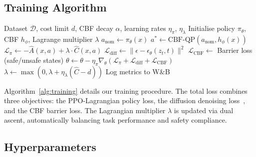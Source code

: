 \documentclass[10pt,twocolumn]{article}
\begin{document}
\subsection{Training Algorithm}

\begin{algorithm}[t]
\caption{FLEET-Safe VLA Training (PPO-Lagrangian + CBF)}
\label{alg:training}
\begin{algorithmic}[1]
\REQUIRE Dataset $\mathcal{D}$, cost limit $d$, CBF decay $\alpha$, learning rates $\eta_\pi$, $\eta_\lambda$
\STATE Initialise policy $\pi_\theta$, CBF $h_\phi$, Lagrange multiplier $\lambda$
        \STATE $a_\text{nom} \leftarrow \pi_\theta(x)$ 
        \STATE $a^* \leftarrow \text{CBF-QP}(a_\text{nom}, h_\phi(x))$ 
        \STATE $\mathcal{L}_\pi \leftarrow -\hat{A}(x,a) + \lambda \cdot \hat{C}(x,a)$ 
        \STATE $\mathcal{L}_\text{diff} \leftarrow \| \epsilon - \epsilon_\theta(z_t, t) \|^2$ 
        \STATE $\mathcal{L}_\text{CBF} \leftarrow$ Barrier loss (safe/unsafe states)
        \STATE $\theta \leftarrow \theta - \eta_\pi \nabla_\theta (\mathcal{L}_\pi + \mathcal{L}_\text{diff} + \mathcal{L}_\text{CBF})$
        \STATE $\lambda \leftarrow \max(0, \lambda + \eta_\lambda (\hat{C} - d))$ 
    \ENDFOR
    \STATE Log metrics to W\&B~\cite{wandb2020}
\ENDFOR
\end{algorithmic}
\end{algorithm}

Algorithm~\ref{alg:training} details our training procedure.
The total loss combines three objectives: the PPO-Lagrangian policy loss, the diffusion denoising loss~\cite{ho2020ddpm, chi2023diffusion}, and the CBF barrier loss.
The Lagrangian multiplier $\lambda$ is updated via dual ascent, automatically balancing task performance and safety compliance.

\subsection{Hyperparameters}
\end{document}
